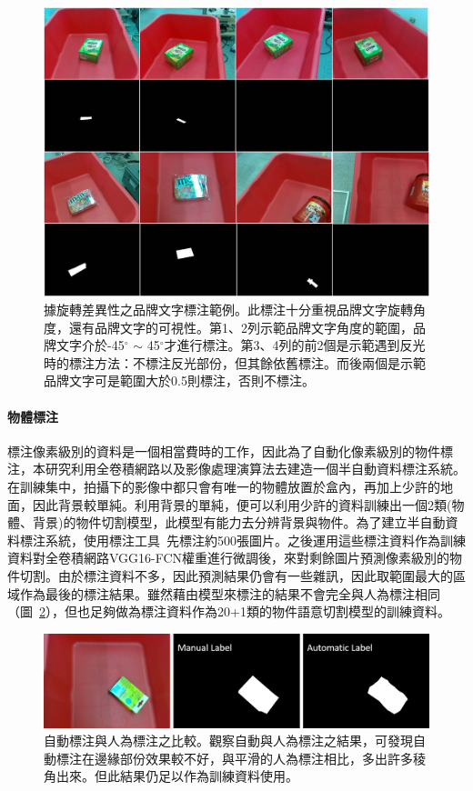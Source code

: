 \begin{figure}[H]
	\centering
	\includegraphics[height=!, width=1.0\linewidth, keepaspectratio=true]
	{./figures/reak_bn_rule.jpg}
  \caption{據旋轉差異性之品牌文字標注範例。此標注十分重視品牌文字旋轉角度，還有品牌文字的可視性。第1、2列示範品牌文字角度的範圍，品牌文字介於-45$^{\circ}$ $\sim$ 45$^{\circ}$才進行標注。第3、4列的前2個是示範遇到反光時的標注方法：不標注反光部份，但其餘依舊標注。而後兩個是示範品牌文字可是範圍大於0.5則標注，否則不標注。}
  \label{figure:reak_bn_rule}
\end{figure}

\paragraph{物體標注}
標注像素級別的資料是一個相當費時的工作，因此為了自動化像素級別的物件標注，本研究利用全卷積網路以及影像處理演算法去建造一個半自動資料標注系統。在訓練集中，拍攝下的影像中都只會有唯一的物體放置於盒內，再加上少許的地面，因此背景較單純。利用背景的單純，便可以利用少許的資料訓練出一個2類(物體、背景)的物件切割模型，此模型有能力去分辨背景與物件。為了建立半自動資料標注系統，使用標注工具~\cite{russell2008labelme}先標注約500張圖片。之後運用這些標注資料作為訓練資料對全卷積網路VGG16-FCN權重進行微調後，來對剩餘圖片預測像素級別的物件切割。由於標注資料不多，因此預測結果仍會有一些雜訊，因此取範圍最大的區域作為最後的標注結果。雖然藉由模型來標注的結果不會完全與人為標注相同（圖~\ref{figure:auto_object_label}），但也足夠做為標注資料作為20+1類的物件語意切割模型的訓練資料。

\begin{figure}[H]
	\centering
	\includegraphics[height=!, width=1.0\linewidth, keepaspectratio=true]
	{./figures/auto_object_label.png}
  \caption{自動標注與人為標注之比較。觀察自動與人為標注之結果，可發現自動標注在邊緣部份效果較不好，與平滑的人為標注相比，多出許多稜角出來。但此結果仍足以作為訓練資料使用。}
  \label{figure:auto_object_label}
\end{figure}

